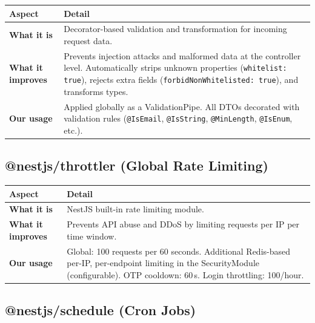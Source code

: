 \documentclass[a4paper,11pt]{article}
\begin{document}
\begin{longtable}{L{3.5cm} L{11.5cm}}
\toprule
\textbf{Aspect} & \textbf{Detail} \\
\midrule
\endhead
\textbf{What it is} & Decorator-based validation and transformation for incoming request data. \\
\midrule
\textbf{What it improves} & Prevents injection attacks and malformed data at the controller level. Automatically strips unknown properties (\texttt{whitelist: true}), rejects extra fields (\texttt{forbidNonWhitelisted: true}), and transforms types. \\
\midrule
\textbf{Our usage} & Applied globally as a ValidationPipe. All DTOs decorated with validation rules (\texttt{@IsEmail}, \texttt{@IsString}, \texttt{@MinLength}, \texttt{@IsEnum}, etc.). \\
\bottomrule
\end{longtable}

\subsection{@nestjs/throttler (Global Rate Limiting)}

\begin{longtable}{L{3.5cm} L{11.5cm}}
\toprule
\textbf{Aspect} & \textbf{Detail} \\
\midrule
\endhead
\textbf{What it is} & NestJS built-in rate limiting module. \\
\midrule
\textbf{What it improves} & Prevents API abuse and DDoS by limiting requests per IP per time window. \\
\midrule
\textbf{Our usage} & Global: 100 requests per 60 seconds. Additional Redis-based per-IP, per-endpoint limiting in the SecurityModule (configurable). OTP cooldown: 60\,s. Login throttling: 100/hour. \\
\bottomrule
\end{longtable}

\subsection{@nestjs/schedule (Cron Jobs)}
\end{document}
